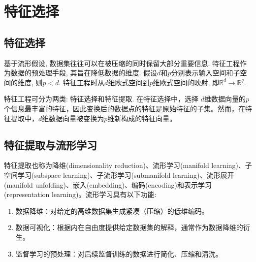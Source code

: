 \documentclass[lang=cn,10pt]{gorgeousnbook}
\numberwithin{equation}{section}%
\numberwithin{figure}{section}%
\begin{document}
\chapter{特征选择}
\begin{center}
\end{center}
\section{特征选择}
基于流形假设, 数据集往往可以在被压缩的同时保留大部分重要信息. 特征工程作为数据的预处理手段, 其旨在降低数据的维度. 假设$d$和$p$分别表示输入空间和子空间的维度, 则$p<d$. 特征工程时从$d$维欧式空间到$p$维欧式空间的映射, 即$\mathbb{R}^d\rightarrow \mathbb{R}^q$. 

特征工程可分为两类: 特征选择和特征提取. 在特征选择中，选择 $d$维数据向量的$p$个信息最丰富的特征，因此变换后的数据点的特征是原始特征的子集。然而，在特征提取中，$d$维数据向量被变换为$p$维新构成的特征向量。

\section{特征提取与流形学习}
特征提取也称为降维(dimensionality reduction)、流形学习(manifold learning)、子空间学习(subspace learning)、子流形学习(submanifold learning)、流形展开(manifold unfolding)、嵌入(embedding)、编码(encoding)和表示学习(representation learning)。流形学习具有以下功能: 

\begin{enumerate}
\item 数据降维：对给定的高维数据集生成紧凑（压缩）的低维编码。
\item 数据可视化：根据内在自由度提供给定数据集的解释，通常作为数据降维的衍生。
\item 监督学习的预处理：对后续监督训练的数据进行简化、压缩和清洗。
\end{enumerate}
\end{document}
